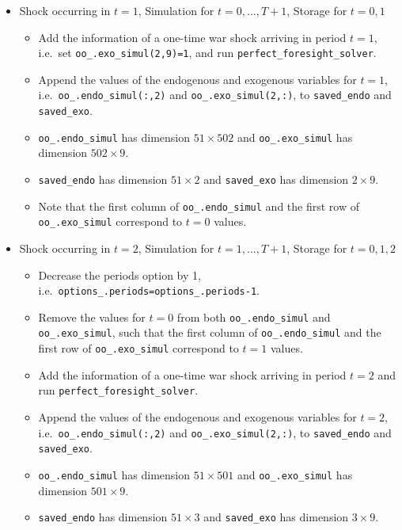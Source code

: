 \documentclass{article}
\begin{document}
\begin{enumerate}
\begin{itemize}
    \item Shock occurring in $t=1$, Simulation for $t=0,...,T+1$, Storage for $t=0,1$
    \begin{itemize}
      \item Add the information of a one-time war shock arriving in period $t=1$, i.e.\
      set \texttt{oo\_.exo\_simul(2,9)=1}, and run \texttt{perfect\_foresight\_solver}.
      \item Append the values of the endogenous and exogenous variables for $t=1$,\\
        i.e.\ \texttt{oo\_.endo\_simul(:,2)} and \texttt{oo\_.exo\_simul(2,:)},
        to \texttt{saved\_endo} and \texttt{saved\_exo}.
      \item \texttt{oo\_.endo\_simul} has dimension $51 \times 502$ and \texttt{oo\_.exo\_simul} has dimension $502 \times 9$.      
      \item \texttt{saved\_endo} has dimension $51 \times 2$ and \texttt{saved\_exo} has dimension $2 \times 9$.
      \item Note that the first column of \texttt{oo\_.endo\_simul} and the first row of \texttt{oo\_.exo\_simul} correspond to $t=0$ values.
    \end{itemize}
    
    \item Shock occurring in $t=2$, Simulation for $t=1,...,T+1$, Storage for $t=0,1,2$
    \begin{itemize}
      \item Decrease the periods option by 1, i.e.\ \texttt{options\_.periods=options\_.periods-1}.
      \item Remove the values for $t=0$ from both \texttt{oo\_.endo\_simul} and \texttt{oo\_.exo\_simul},
      such that the first column of \texttt{oo\_.endo\_simul} and the first row of \texttt{oo\_.exo\_simul} correspond to $t=1$ values.
      \item Add the information of a one-time war shock arriving in period $t=2$ and run \texttt{perfect\_foresight\_solver}.
      \item Append the values of the endogenous and exogenous variables for $t=2$,\\
        i.e.\ \texttt{oo\_.endo\_simul(:,2)} and \texttt{oo\_.exo\_simul(2,:)},
        to \texttt{saved\_endo} and \texttt{saved\_exo}.
      \item \texttt{oo\_.endo\_simul} has dimension $51 \times 501$ and \texttt{oo\_.exo\_simul} has dimension $501 \times 9$.
      \item \texttt{saved\_endo} has dimension $51 \times 3$ and \texttt{saved\_exo} has dimension $3 \times 9$.
    \end{itemize}


\end{itemize}
\end{enumerate}
\end{document}
